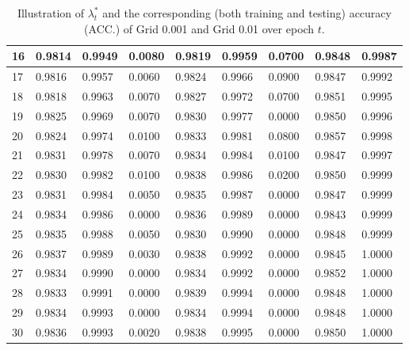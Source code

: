 \documentclass[review,10pt]{JMtemplate}
\begin{document}
\begin{table}[!htb]
{\begin{tabular}{l|ll|lll|lll}
        16  & 0.9814  & 0.9949  & 0.0080  & 0.9819  & 0.9959  & 0.0700  & 0.9848  & 0.9987  \\ \hline
        17  & 0.9816  & 0.9957  & 0.0060  & 0.9824  & 0.9966  & 0.0900  & 0.9847  & 0.9992  \\ \hline
        18  & 0.9818  & 0.9963  & 0.0070  & 0.9827  & 0.9972  & 0.0700  & 0.9851  & 0.9995  \\ \hline
        19  & 0.9825  & 0.9969  & 0.0070  & 0.9830  & 0.9977  & 0.0000  & 0.9850  & 0.9996  \\ \hline
        20  & 0.9824  & 0.9974  & 0.0100  & 0.9833  & 0.9981  & 0.0800  & 0.9857  & 0.9998  \\ \hline
        21  & 0.9831  & 0.9978  & 0.0070  & 0.9834  & 0.9984  & 0.0100  & 0.9847  & 0.9997  \\ \hline
        22  & 0.9830  & 0.9982  & 0.0100  & 0.9838  & 0.9986  & 0.0200  & 0.9850  & 0.9999  \\ \hline
        23  & 0.9831  & 0.9984  & 0.0050  & 0.9835  & 0.9987  & 0.0000  & 0.9847  & 0.9999  \\ \hline
        24  & 0.9834  & 0.9986  & 0.0000  & 0.9836  & 0.9989  & 0.0000  & 0.9843  & 0.9999  \\ \hline
        25  & 0.9835  & 0.9988  & 0.0050  & 0.9830  & 0.9990  & 0.0000  & 0.9848  & 0.9999  \\ \hline
        26  & 0.9837  & 0.9989  & 0.0030  & 0.9838  & 0.9992  & 0.0000  & 0.9845  & 1.0000  \\ \hline
        27  & 0.9834  & 0.9990  & 0.0000  & 0.9834  & 0.9992  & 0.0000  & 0.9852  & 1.0000  \\ \hline
        28  & 0.9833  & 0.9991  & 0.0000  & 0.9839  & 0.9994  & 0.0000  & 0.9848  & 1.0000  \\ \hline
        29  & 0.9834  & 0.9993  & 0.0000  & 0.9834  & 0.9994  & 0.0000  & 0.9848  & 1.0000  \\ \hline
        30  & 0.9836  & 0.9993  & 0.0020  & 0.9838  & 0.9995  & 0.0000  & 0.9850  & 1.0000  \\
        \bottomrule
    \end{tabular}  }
    \caption{Illustration of $\lambda^*_t$ and the corresponding (both training and testing) accuracy (ACC.) of Grid 0.001 and Grid 0.01 over epoch $t$.}
    \label{tab:accuracy_app}
\end{table}
\end{document}
